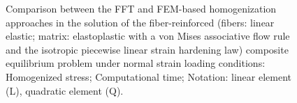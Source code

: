 \begin{figure}[hbt]
\begin{subfigure}[b]{0.49\textwidth}
      \caption{}
      \label{subfig:von_mises_res_mat_small_strain_2D_shear_material_response_error}
    \end{subfigure}
  \caption{Comparison between the FFT and FEM-based homogenization approaches in the solution
  of the fiber-reinforced (fibers: linear elastic; matrix: elastoplastic with a von Mises associative flow rule and the isotropic piecewise linear strain hardening law) composite equilibrium problem under normal strain
  loading conditions:  Homogenized
  stress;  Computational time;
  Notation: linear element (L), quadratic element (Q).}
\label{fig:von_mises_res_mat_small_strain_2D_shear_material_response_and_error}
\end{figure}

